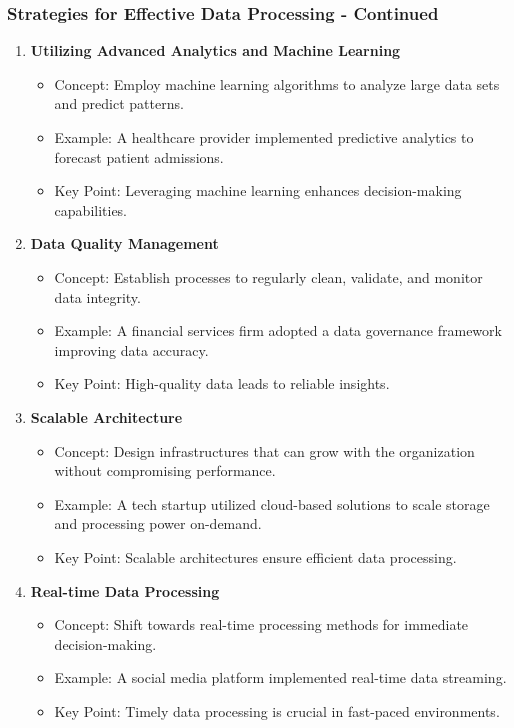 \documentclass[aspectratio=169]{beamer}
\begin{document}
\begin{frame}[fragile]
    \frametitle{Strategies for Effective Data Processing - Continued}
    \begin{enumerate}[resume]
        \item \textbf{Utilizing Advanced Analytics and Machine Learning}
            \begin{itemize}
                \item Concept: Employ machine learning algorithms to analyze large data sets and predict patterns.
                \item Example: A healthcare provider implemented predictive analytics to forecast patient admissions.
                \item Key Point: Leveraging machine learning enhances decision-making capabilities.
            \end{itemize}
        \item \textbf{Data Quality Management}
            \begin{itemize}
                \item Concept: Establish processes to regularly clean, validate, and monitor data integrity.
                \item Example: A financial services firm adopted a data governance framework improving data accuracy.
                \item Key Point: High-quality data leads to reliable insights.
            \end{itemize}
        \item \textbf{Scalable Architecture}
            \begin{itemize}
                \item Concept: Design infrastructures that can grow with the organization without compromising performance.
                \item Example: A tech startup utilized cloud-based solutions to scale storage and processing power on-demand.
                \item Key Point: Scalable architectures ensure efficient data processing.
            \end{itemize}
        \item \textbf{Real-time Data Processing}
            \begin{itemize}
                \item Concept: Shift towards real-time processing methods for immediate decision-making.
                \item Example: A social media platform implemented real-time data streaming.
                \item Key Point: Timely data processing is crucial in fast-paced environments.
            \end{itemize}
    \end{enumerate}
\end{frame}
\end{document}
